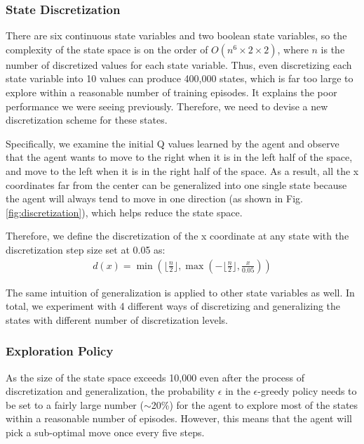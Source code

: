 \documentclass[10pt, conference]{IEEEtran}
\begin{document}
\subsubsection{State Discretization}
There are six continuous state variables and two boolean state variables, so the complexity of the state space is on the order of $O(n^6 \times 2 \times 2)$, where $n$ is the number of discretized values for each state variable. Thus, even discretizing each state variable into 10 values can produce 400,000 states, which is far too large to explore within a reasonable number of training episodes. It explains the poor performance we were seeing previously. Therefore, we need to devise a new discretization scheme for these states.

Specifically, we examine the initial Q values learned by the agent and observe that the agent wants to move to the right when it is in the left half of the space, and move to the left when it is in the right half of the space. As a result, all the x coordinates far from the center can be generalized into one single state because the agent will always tend to move in one direction (as shown in Fig. \ref{fig:discretization}), which helps reduce the state space.

Therefore, we define the discretization of the x coordinate at any state with the discretization step size set at 0.05 as:
\begin{equation}
\begin{aligned}
    d(x) = \min(\lfloor \frac{n}{2} \rfloor, \max(-\lfloor \frac{n}{2} \rfloor, \frac{x}{\text{0.05}}))
\end{aligned} 
\end{equation}

The same intuition of generalization is applied to other state variables as well. In total, we experiment with 4 different ways of discretizing and generalizing the states with different number of discretization levels. 



\subsubsection{Exploration Policy}
As the size of the state space exceeds 10,000 even after the process of discretization and generalization, the probability $\epsilon$ in the $\epsilon$-greedy policy needs to be set to a fairly large number ($\sim$20\%) for the agent to explore most of the states within a reasonable number of episodes. However, this means that the agent will pick a sub-optimal move once every five steps.
\end{document}
